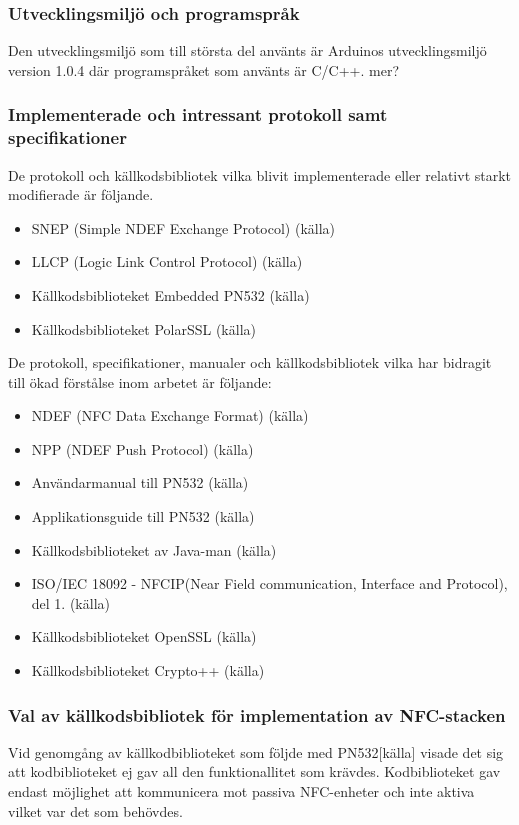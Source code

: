 \documentclass[11pt]{article}
\begin{document}
\subsubsection{Utvecklingsmiljö och programspråk}
Den utvecklingsmiljö som till största del använts är Arduinos utvecklingsmiljö version 1.0.4 där programspråket som använts är C/C++. mer?

\subsubsection{Implementerade och intressant protokoll samt specifikationer}
De protokoll och källkodsbibliotek vilka blivit implementerade eller relativt starkt modifierade är följande.
\begin{itemize}
\item SNEP (Simple NDEF Exchange Protocol) (källa)
\item LLCP (Logic Link Control Protocol) (källa)
\item Källkodsbiblioteket Embedded PN532 (källa)
\item Källkodsbiblioteket PolarSSL (källa)
\end{itemize}
De protokoll, specifikationer, manualer och källkodsbibliotek vilka har bidragit till ökad förstålse inom arbetet är följande:
\begin{itemize}
\item NDEF (NFC Data Exchange Format) (källa)
\item NPP (NDEF Push Protocol) (källa)
\item Användarmanual till PN532 (källa)
\item Applikationsguide till PN532 (källa)
\item Källkodsbiblioteket av Java-man (källa)
\item ISO/IEC 18092 - NFCIP(Near Field communication, Interface and Protocol), del 1. (källa)
\item Källkodsbiblioteket OpenSSL (källa)
\item Källkodsbiblioteket Crypto++ (källa)
\end{itemize}

\subsubsection{Val av källkodsbibliotek för implementation av NFC-stacken}
Vid genomgång av källkodbiblioteket som följde med PN532[källa] visade det sig att kodbiblioteket ej gav all den funktionallitet som krävdes. Kodbiblioteket gav endast möjlighet att kommunicera mot passiva NFC-enheter och inte aktiva vilket var det som behövdes. 
\end{document}
